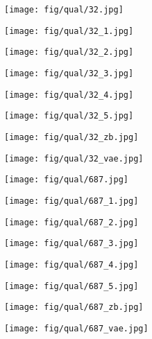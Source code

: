 \documentclass[10pt,twocolumn,letterpaper]{article}
\newcommand{\sz}{0.102}
\newcommand{\szl}{0.067}
\begin{document}
\begin{figure*}[t]
\begin{subfigure}[c]{\sz\linewidth}
\texttt{[image: fig/qual/32.jpg]}
\end{subfigure}
\begin{subfigure}[c]{\sz\linewidth}
\texttt{[image: fig/qual/32\_1.jpg]}
\end{subfigure}
\begin{subfigure}[c]{\sz\linewidth}
\texttt{[image: fig/qual/32\_2.jpg]}
\end{subfigure}
\begin{subfigure}[c]{\sz\linewidth}
\texttt{[image: fig/qual/32\_3.jpg]}
\end{subfigure}
\begin{subfigure}[c]{\sz\linewidth}
\texttt{[image: fig/qual/32\_4.jpg]}
\end{subfigure}
\hspace{3pt}
\begin{subfigure}[c]{\sz\linewidth}
\texttt{[image: fig/qual/32\_5.jpg]}
\end{subfigure}
\begin{subfigure}[c]{\szl\linewidth}
\texttt{[image: fig/qual/32\_zb.jpg]}
\end{subfigure}
\hspace{3pt}
\begin{subfigure}[c]{\szl\linewidth}
\texttt{[image: fig/qual/32\_vae.jpg]}
\end{subfigure}


\begin{subfigure}[c]{\sz\linewidth}
\texttt{[image: fig/qual/687.jpg]}
\end{subfigure}
\begin{subfigure}[c]{\sz\linewidth}
\texttt{[image: fig/qual/687\_1.jpg]}
\end{subfigure}
\begin{subfigure}[c]{\sz\linewidth}
\texttt{[image: fig/qual/687\_2.jpg]}
\end{subfigure}
\begin{subfigure}[c]{\sz\linewidth}
\texttt{[image: fig/qual/687\_3.jpg]}
\end{subfigure}
\begin{subfigure}[c]{\sz\linewidth}
\texttt{[image: fig/qual/687\_4.jpg]}
\end{subfigure}
\hspace{3pt}
\begin{subfigure}[c]{\sz\linewidth}
\texttt{[image: fig/qual/687\_5.jpg]}
\end{subfigure}
\begin{subfigure}[c]{\szl\linewidth}
\texttt{[image: fig/qual/687\_zb.jpg]}
\end{subfigure}
\hspace{3pt}
\begin{subfigure}[c]{\szl\linewidth}
\texttt{[image: fig/qual/687\_vae.jpg]}
\end{subfigure}


\end{figure*}
\end{document}
